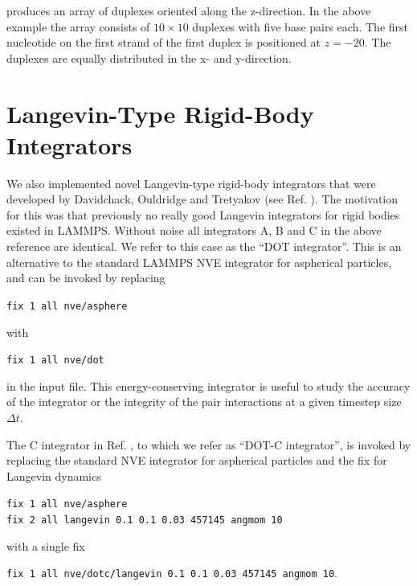 \documentclass[12pt,onecolumn]{article}
\begin{document}
\noindent produces an array of duplexes oriented along the z-direction. 
In the above example the array consists of $10 \times 10$ duplexes with five base pairs each.
The first nucleotide on the first strand of the first duplex is positioned at $z=-20$. The duplexes
are equally distributed in the x- and y-direction.  

\section{Langevin-Type Rigid-Body Integrators}

We also implemented novel Langevin-type rigid-body integrators that were developed
by Davidchack, Ouldridge and Tretyakov (see Ref. \cite{Davidchack:2015}).
The motivation for this was that previously no really good Langevin integrators for rigid bodies
existed in LAMMPS.
Without noise all integrators A, B and C in the above reference are identical.
We refer to this case as the ``DOT integrator''. This is an alternative to the  
standard LAMMPS NVE integrator for aspherical particles, and can be invoked by replacing

\smallskip
\texttt{fix 1 all nve/asphere}\\
\smallskip

\noindent with

\smallskip
\texttt{fix 1 all nve/dot}\\
\smallskip

\noindent in the input file. This energy-conserving integrator is useful to study the accuracy of the 
integrator or the integrity of the pair interactions at a given timestep size $\Delta t$.

\noindent The C integrator in Ref. \cite{Davidchack:2015}, to which we refer as ``DOT-C integrator'',
 is invoked by replacing the standard NVE integrator 
for aspherical particles and the fix for Langevin dynamics 

\smallskip
\texttt{fix 1 all nve/asphere}\\
\texttt{fix 2 all langevin 0.1 0.1 0.03 457145 angmom 10}\\
\smallskip

\noindent with a single fix

\smallskip
\texttt{fix 1 all nve/dotc/langevin 0.1 0.1 0.03 457145 angmom 10}.\\
\smallskip
\end{document}
